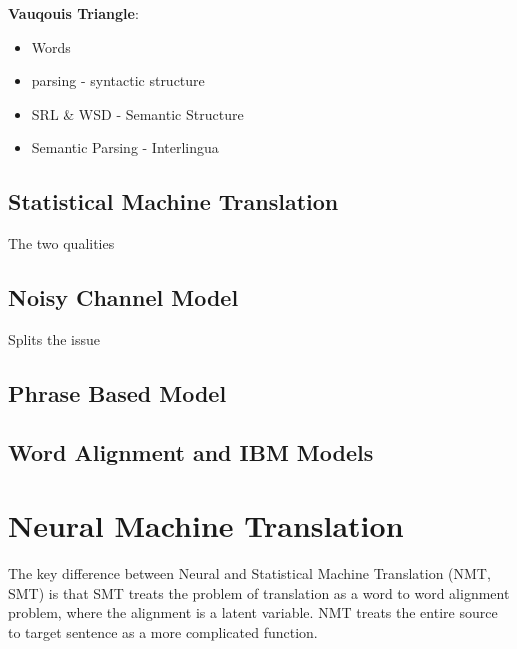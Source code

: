 \documentclass[]{article}
\begin{document}
	\textbf{Vauqouis Triangle}:
	
	\begin{itemize}
		\item Words 
		\item parsing -  syntactic structure
		\item SRL \& WSD - Semantic Structure
		\item Semantic Parsing -  Interlingua
	\end{itemize}
	
	\subsection{Statistical Machine Translation}
	
	The two qualities 
	
	
	\subsection{Noisy Channel Model}
	
	Splits the issue 
	
	\subsection{Phrase Based Model}
	
	\subsection{Word Alignment and IBM Models}
	
	\clearpage
	\section{Neural Machine Translation}
	
	The key difference between Neural and Statistical Machine Translation (NMT, SMT) is that SMT treats the problem of translation as a word to word alignment problem, where the alignment is a latent variable. NMT treats the entire source to target sentence as a more complicated function. \\
	
\end{document}
